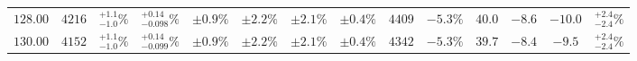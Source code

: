 \begin{landscape}
\begin{table}[ht!]
{\begin{tabular}{| cc | ccc | ccc | ccc | cc | c |}
$128.00$ & $4216$ & $^{+1.1}_{-1.0}\%$ & {\color{black!55}$^{+0.14}_{-0.098}\%$} & {\color{black!55}$\pm 0.9\%$} & $\pm 2.2\%$ & {\color{black!55}$\pm 2.1\%$} & {\color{black!55}$\pm 0.4\%$} & $4409$ & $-5.3\%$ & $40.0$ & $-8.6$ & $-10.0$ & $^{+2.4}_{-2.4}\%$ \\
$130.00$ & $4152$ & $^{+1.1}_{-1.0}\%$ & {\color{black!55}$^{+0.14}_{-0.099}\%$} & {\color{black!55}$\pm 0.9\%$} & $\pm 2.2\%$ & {\color{black!55}$\pm 2.1\%$} & {\color{black!55}$\pm 0.4\%$} & $4342$ & $-5.3\%$ & $39.7$ & $-8.4$ & $-9.5$ & $^{+2.4}_{-2.4}\%$ \\
\cline{1-14}
\end{tabular}
}
\end{table}
\end{landscape}











































